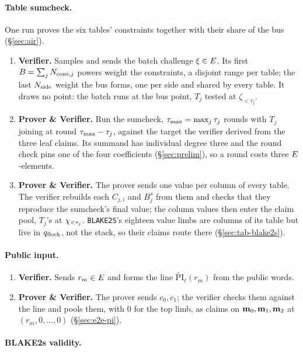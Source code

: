 \paragraph{Table sumcheck.} One run proves the six tables' constraints together with their share of the bus (\S\ref{sec:air}).
\begin{enumerate}
\item \textbf{Verifier.} Samples and sends the batch challenge $\xi\in E$. Its first $B=\sum_jN_{\mathrm{cons},j}$ powers weight the constraints, a disjoint range per table; the last $N_{\mathrm{side}}$ weight the bus forms, one per side and shared by every table. It draws no point: the batch runs at the bus point, $T_j$ tested at $\zeta_{<\tau_j}$.
\item \textbf{Prover \& Verifier.} Run the sumcheck, $\tau_{\max}=\max_j\tau_j$ rounds with $T_j$ joining at round $\tau_{\max}-\tau_j$, against the target the verifier derived from the three leaf claims. Its summand has individual degree three and the round check pins one of the four coefficients (\S\ref{sec:prelim}), so a round costs three $E$-elements.
\item \textbf{Prover \& Verifier.} The prover sends one value per column of every table. The verifier rebuilds each $C_{j,i}$ and $B^{s}_j$ from them and checks that they reproduce the sumcheck's final value; the column values then enter the claim pool, $T_j$'s at $\chi_{<\tau_j}$. \texttt{BLAKE2S}'s eighteen value limbs are columns of its table but live in $q_{\mathrm{flock}}$, not the stack, so their claims route there (\S\ref{sec:tab-blake2s}).
\end{enumerate}

\paragraph{Public input.}

\begin{enumerate}
\item \textbf{Verifier.} Sends $r_m\in E$ and forms the line $\widetilde{\mathrm{PI}}_\ell(r_m)$ from the public words.
\item \textbf{Prover \& Verifier.} The prover sends $c_0,c_1$; the verifier checks them against the line and pools them, with $0$ for the top limb, as claims on $\mathbf{m}_0,\mathbf{m}_1,\mathbf{m}_2$ at $(r_m,0,\dots,0)$ (\S\ref{sec:e2e-pi}).
\end{enumerate}

\paragraph{BLAKE2s validity.}

